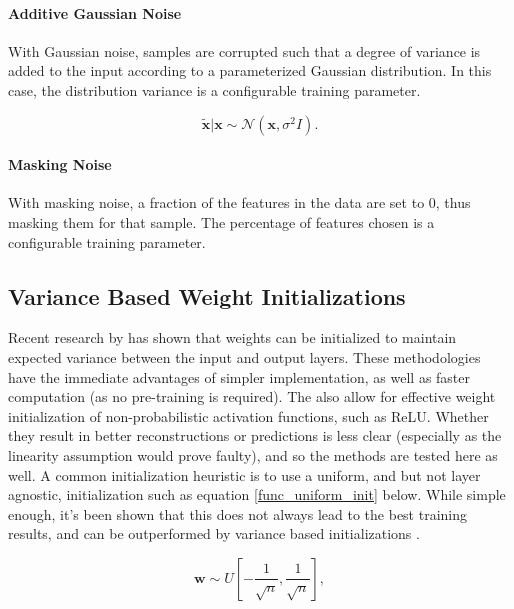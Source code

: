 \documentclass[a4paper,11pt,oneside]{article}
\theoremstyle{plain}
\theoremstyle{definition}
\begin{document}
	\paragraph{Additive Gaussian Noise}
	
	With Gaussian noise, samples are corrupted such that a degree of variance is added to the input according to a parameterized Gaussian distribution. In this case, the distribution variance is a configurable training parameter.
	
	\begin{equation}
	\mathbf{\tilde{{x}}} | \mathbf{x} \sim \mathcal{N}\left(\mathbf{x}, \sigma^{2} I\right) .
	\end{equation}
	
	\paragraph{Masking Noise}
	
	With masking noise, a fraction of the features in the data are set to 0, thus masking them for that sample. The percentage of features chosen is a configurable training parameter.
	
	\subsection{Variance Based Weight Initializations}\label{imp_weights}
	
	Recent research by \citet{He} has shown that weights can be initialized to maintain expected variance between the input and output layers. These methodologies have the immediate advantages of simpler implementation, as well as faster computation (as no pre-training is required). The also allow for effective weight initialization of non-probabilistic activation functions, such as ReLU. Whether they result in better reconstructions or predictions is less clear (especially as the linearity assumption would prove faulty), and so the methods are tested here as well. 
	\newline\newline
	A common initialization heuristic is to use a uniform, and but not layer agnostic, initialization such as equation \eqref{func_uniform_init} below. While simple enough, it's been shown that this does not always lead to the best training results, and can be outperformed by variance based initializations \citep{Glorot}.
	
	\begin{equation}\label{func_uniform_init}
	\mathbf{w} \sim U\left[-\frac{1}{\sqrt{n}}, \frac{1}{\sqrt{n}}\right] ,
	\end{equation}
	
\end{document}
